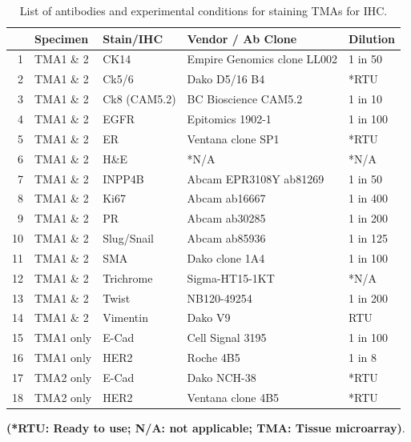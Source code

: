\begin{table}
\centering
\caption{List of antibodies and experimental conditions for staining TMAs for IHC.}


\label{stab:antibodieslist}
\begin{tabular}{|rl|l|l|l|}
  \hline
 & Specimen & Stain/IHC & Vendor / Ab Clone & Dilution  \\ 
  \hline
1 & TMA1 \& 2 & CK14 & Empire Genomics clone LL002 & 1 in 50 \\ 
  2 & TMA1 \& 2 & Ck5/6 & Dako D5/16 B4 & *RTU  \\ 
  3 & TMA1 \& 2 & Ck8 (CAM5.2) & BC Bioscience CAM5.2 & 1 in 10  \\ 
  4 & TMA1 \& 2 & EGFR & Epitomics 1902-1 & 1 in 100  \\ 
  5 & TMA1 \& 2 & ER & Ventana  clone SP1 & *RTU\\ 
  6 & TMA1 \& 2 & H\&E & *N/A & *N/A \\ 
  7 & TMA1 \& 2 & INPP4B & Abcam EPR3108Y ab81269 & 1 in 50 \\ 
  8 & TMA1 \& 2 & Ki67 & Abcam ab16667  & 1 in 400  \\ 
  9 & TMA1 \& 2 & PR & Abcam ab30285 & 1 in 200  \\ 
  10 & TMA1 \& 2 & Slug/Snail & Abcam ab85936 & 1 in 125 \\ 
  11 & TMA1 \& 2 & SMA & Dako clone 1A4 & 1 in 100 \\ 
  12 & TMA1 \& 2 & Trichrome & Sigma-HT15-1KT & *N/A \\ 
  13 & TMA1 \& 2 & Twist & NB120-49254 & 1 in 200\\ 
  14 & TMA1 \& 2 & Vimentin & Dako V9 & RTU  \\ 
  15 & TMA1 only & E-Cad & Cell Signal 3195 & 1 in 100  \\ 
  16 & TMA1 only & HER2 & Roche 4B5 & 1 in 8  \\ 
  17 & TMA2 only & E-Cad & Dako NCH-38 & *RTU  \\ 
  18 & TMA2 only & HER2 & Ventana  clone 4B5 & *RTU \\ 
   \hline
\end{tabular}%


\small\textbf{(*RTU: Ready to use; N/A: not applicable; TMA: Tissue microarray)}.

\end{table}


